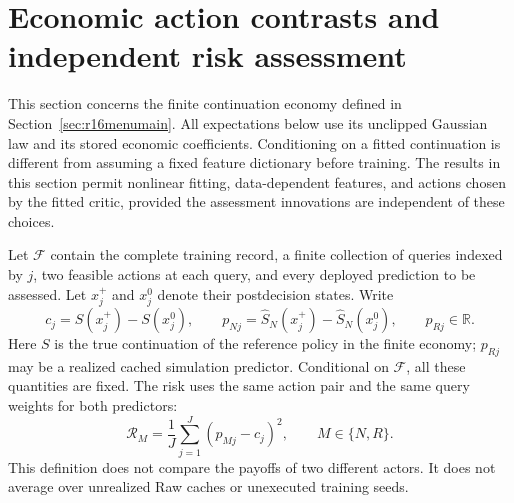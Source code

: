 \section{Economic action contrasts and independent risk assessment}\label{sec:r17-contrast-proofs}
This section concerns the finite continuation economy defined in
Section~\ref{sec:r16menumain}. All expectations below use its unclipped Gaussian
law and its stored economic coefficients. Conditioning on a fitted continuation
is different from assuming a fixed feature dictionary before training. The
results in this section permit nonlinear fitting, data-dependent features, and
actions chosen by the fitted critic, provided the assessment innovations are
independent of these choices.

Let $\mathcal F$ contain the complete training record, a finite collection of
queries indexed by $j$, two feasible actions at each query, and every deployed
prediction to be assessed. Let $x_j^+$ and $x_j^0$ denote their postdecision
states. Write
\[
 c_j=S(x_j^+)-S(x_j^0),\qquad
 p_{Nj}=\widehat S_N(x_j^+)-\widehat S_N(x_j^0),\qquad p_{Rj}\in\mathbb R.
\]
Here $S$ is the true continuation of the reference policy in the finite economy;
$p_{Rj}$ may be a realized cached simulation predictor. Conditional on
$\mathcal F$, all these quantities are fixed. The risk uses the same action pair
and the same query weights for both predictors:
\begin{equation}\label{eq:r17-risk}
 \mathcal R_M=\frac1J\sum_{j=1}^J(p_{Mj}-c_j)^2,
 \qquad M\in\{N,R\}.
\end{equation}
This definition does not compare the payoffs of two different actors. It does
not average over unrealized Raw caches or unexecuted training seeds.

